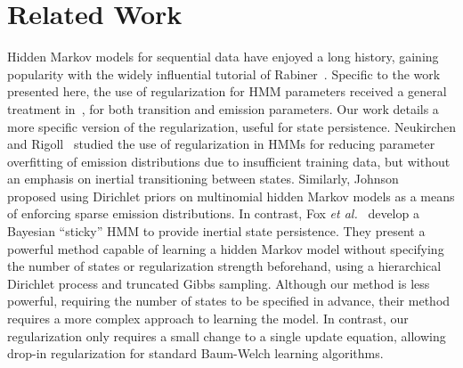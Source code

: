 \documentclass[12pt]{article}
\begin{document}
\section{Related Work}

Hidden Markov models for sequential data have enjoyed a long history, gaining popularity with the widely influential tutorial of Rabiner~\cite{rabiner1989tutorial}. Specific to the work presented here, the use of regularization for HMM parameters received a general treatment in~\cite{MAP1994}, for both transition and emission parameters. Our work details a more specific version of the regularization, useful for state persistence. Neukirchen and Rigoll~\cite{neukirchen1999controlling} studied the use of regularization in HMMs for reducing parameter overfitting of emission distributions due to insufficient training data, but without an emphasis on inertial transitioning between states. Similarly, Johnson~\cite{Johnson07whydoesnt} proposed using Dirichlet priors on multinomial hidden Markov models as a means of enforcing sparse emission distributions. In contrast, Fox \emph{et al.}\ \cite{fox2011sticky} develop a Bayesian ``sticky'' HMM to provide inertial state persistence. They present a powerful method capable of learning a hidden Markov model without specifying the number of states or regularization strength beforehand, using a hierarchical Dirichlet process and truncated Gibbs sampling. Although our method is less powerful, requiring the number of states to be specified in advance, their method requires a more complex approach to learning the model. In contrast, our regularization only requires a small change to a single update equation, allowing drop-in regularization for standard Baum-Welch learning algorithms. 



\end{document}
